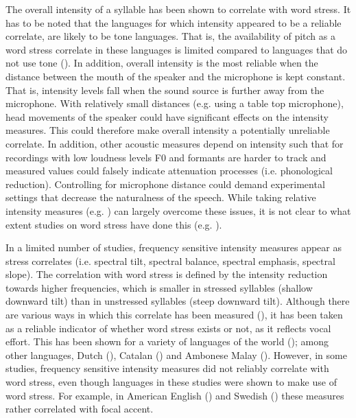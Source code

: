 The overall intensity of a syllable has been shown to correlate with word stress. It has to be noted that the languages for which intensity appeared to be a reliable correlate, are likely to be tone languages. That is, the availability of pitch as a word stress correlate in these languages is limited compared to languages that do not use tone (\citealt{gordon_acoustic_2017}). In addition, overall intensity is the most reliable when the distance between the mouth of the speaker and the microphone is kept constant. That is, intensity levels fall when the sound source is further away from the microphone. With relatively small distances (e.g. using a table top microphone), head movements of the speaker could have significant effects on the intensity measures. This could therefore make overall intensity a potentially unreliable correlate. In addition, other acoustic measures depend on intensity such that for recordings with low loudness levels F0 and formants are harder to track and measured values could falsely indicate attenuation processes (i.e. phonological reduction). Controlling for microphone distance could demand experimental settings that decrease the naturalness of the speech. While taking relative intensity measures (e.g. \citealt{remijsen_stress_2005}) can largely overcome these issues, it is not clear to what extent studies on word stress have done this (e.g. \citealt{vogel_prominence_2016}).\par

In a limited number of studies, frequency sensitive intensity measures appear as stress correlates (i.e. spectral tilt, spectral balance, spectral emphasis, spectral slope). The correlation with word stress is defined by the intensity reduction towards higher frequencies, which is smaller in stressed syllables (shallow downward tilt) than in unstressed syllables (steep downward tilt). Although there are various ways in which this correlate has been measured (\citealt{heldner_reliability_2003}), it has been taken as a reliable indicator of whether word stress exists or not, as it reflects vocal effort. This has been shown for a variety of languages of the world (\citealt{gordon_acoustic_2017}); among other languages, Dutch (\citealt{sluijter_spectral_1996}), Catalan (\citealt{ortega-llebaria_acoustic_2011}) and Ambonese Malay (\citealt{maskikit-essed_no_2016}). However, in some studies, frequency sensitive intensity measures did not reliably correlate with word stress, even though languages in these studies were shown to make use of word stress. For example, in American English (\citealt{campbell_stress_1997}) and Swedish (\citealt{heldner_reliability_2003}) these measures rather correlated with focal accent.\par

